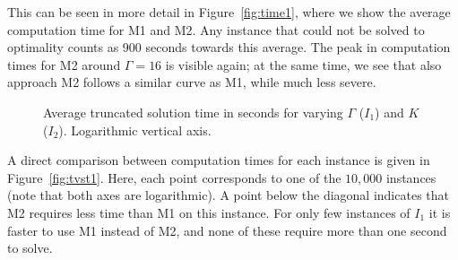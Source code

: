 \documentclass[a4paper,11pt,abstracton]{scrartcl}
\theoremstyle{definition}
\theoremstyle{remark}
\begin{document}
This can be seen in more detail in Figure~\ref{fig:time1}, where we show the average computation time for M1 and M2. Any instance that could not be solved to optimality counts as 900 seconds towards this average.
The peak in computation times for M2 around $\Gamma=16$ is visible again; at the same time, we see that also approach M2 follows a similar curve as M1, while much less severe.

\begin{figure}[htb]
\begin{center}
%
\hfill
{}
\end{center}
\caption{Average truncated solution time in seconds for varying $\Gamma$ ($I_1$) and $K$ ($I_2$). Logarithmic vertical axis.\label{fig:time}}
\end{figure}	

A direct comparison between computation times for each instance is given in Figure~\ref{fig:tvst1}. Here, each point corresponds to one of the $10,000$ instances (note that both axes are logarithmic). A point below the diagonal indicates that M2 requires less time than M1 on this instance. For only few instances of $I_1$ it is faster to use M1 instead of M2, and none of these require more than one second to solve.
\end{document}
